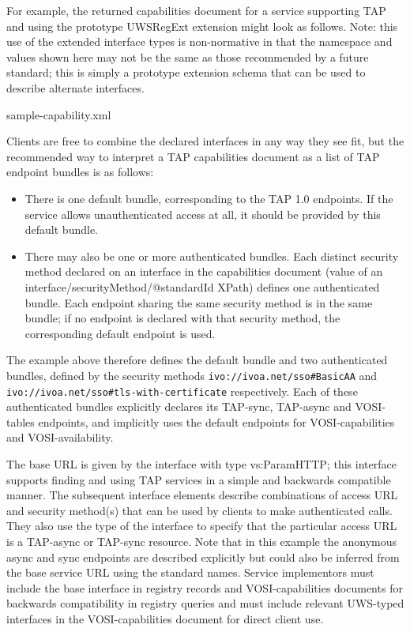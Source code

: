 \documentclass[11pt,letter]{ivoa}
\begin{document}
For example, the returned capabilities document for a service supporting TAP and using the prototype UWSRegExt \citep{note:UWSRegExt} extension might look as follows. Note: this use of the extended interface types is non-normative in that the namespace and values shown here may not be the same as those recommended by a future standard; this is simply a prototype extension schema that can be used to describe alternate interfaces.


  {sample-capability.xml}

Clients are free to combine the declared interfaces in any way they see fit, but the recommended way to interpret a TAP capabilities document as a list of TAP endpoint bundles is as follows:
\begin{itemize}
\item There is one default bundle, corresponding to the TAP 1.0 endpoints. If the service allows unauthenticated access at all, it should be provided by this default bundle.
\item There may also be one or more authenticated bundles. Each distinct security method declared on an interface in the capabilities document (value of an interface/securityMethod/@standardId XPath) defines one authenticated bundle. Each endpoint sharing the same security method is in the same bundle; if no endpoint is declared with that security method, the corresponding default endpoint is used. 
\end{itemize}

The example above therefore defines the default bundle and two authenticated bundles, defined by the security methods \verb|ivo://ivoa.net/sso#BasicAA| and \verb|ivo://ivoa.net/sso#tls-with-certificate| respectively. Each of these authenticated bundles explicitly declares its TAP-sync, TAP-async and VOSI-tables endpoints, and implicitly uses the default endpoints for VOSI-capabilities and VOSI-availability.

The base URL is given by the interface with type vs:ParamHTTP; this interface supports 
finding and using TAP services in a simple and backwards 
compatible manner. The subsequent interface elements describe combinations of access URL
and security method(s) that can be used by clients to make authenticated calls. They also 
use the type of the interface to specify that the particular access URL is a TAP-async or TAP-sync 
resource. Note that in this example the anonymous async and sync endpoints are 
described explicitly but could also be inferred from the base service URL using the standard 
names. Service implementors must include the base interface in registry records and VOSI-capabilities documents
for backwards compatibility in registry queries and must include relevant UWS-typed interfaces in the 
VOSI-capabilities document for direct client use.
\end{document}
